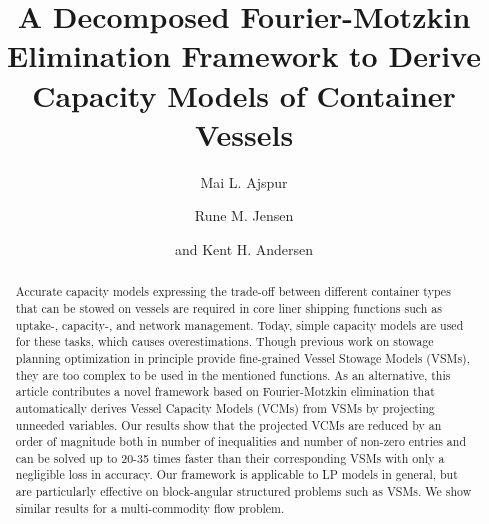 \documentclass{llncs}
\begin{document}
\title{A Decomposed Fourier-Motzkin Elimination Framework to Derive Capacity Models of Container Vessels}
\author{Mai L. Ajspur \and Rune M. Jensen \and and Kent H. Andersen}

\maketitle

\begin{abstract}
Accurate capacity models expressing the trade-off between different container types that can be stowed
on vessels are required in core liner shipping functions such as uptake-, capacity-, and network management.
Today, simple capacity models are used for these tasks, which causes overestimations. 
Though previous work on stowage planning optimization in principle provide fine-grained Vessel Stowage Models (VSMs), they are too complex to be used in the mentioned functions. 
As an alternative, this article contributes a novel framework based on Fourier-Motzkin
elimination that automatically derives Vessel Capacity Models (VCMs) from VSMs by projecting unneeded
variables. Our results show that the projected VCMs are reduced by an order of magnitude both in number of
inequalities and number of non-zero entries and can be solved up to 20-35 times faster than their corresponding VSMs with only a negligible loss in accuracy. 
Our framework is applicable to LP models in general, but are particularly effective on block-angular structured problems such as VSMs. We show similar results for a multi-commodity flow problem.
\end{abstract}
\end{document}
